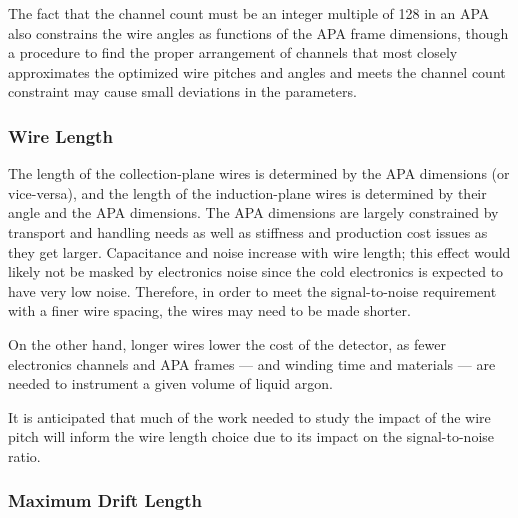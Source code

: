 The fact that the channel count must be an integer multiple of 128 in
an APA also constrains the wire angles as functions of the APA frame
dimensions, though a procedure to find the proper arrangement of
channels that most closely approximates the optimized wire pitches and
angles and meets the channel count constraint may cause small
deviations in the parameters.

\subsubsection{Wire Length}

The length of the collection-plane wires is determined by the APA
dimensions (or vice-versa), and the length of the induction-plane
wires is determined by their angle and the APA dimensions.  The APA
dimensions are largely constrained by transport and handling needs as
well as stiffness and production cost issues as they get larger.
Capacitance and noise increase with wire length; this effect would
likely not be masked by electronics noise since the cold electronics
is expected to have very low noise.  Therefore, in order to meet the
signal-to-noise requirement with a finer wire spacing, the wires may
need to be made shorter.

On the other hand, longer wires lower the cost of the detector, as
fewer electronics channels and APA frames --- and winding time and
materials --- are needed to instrument a given volume of liquid argon.

It is anticipated that much of the work needed to study the impact of
the wire pitch will inform the wire length choice due to its impact on
the signal-to-noise ratio.

\subsubsection{Maximum Drift Length}

% 


